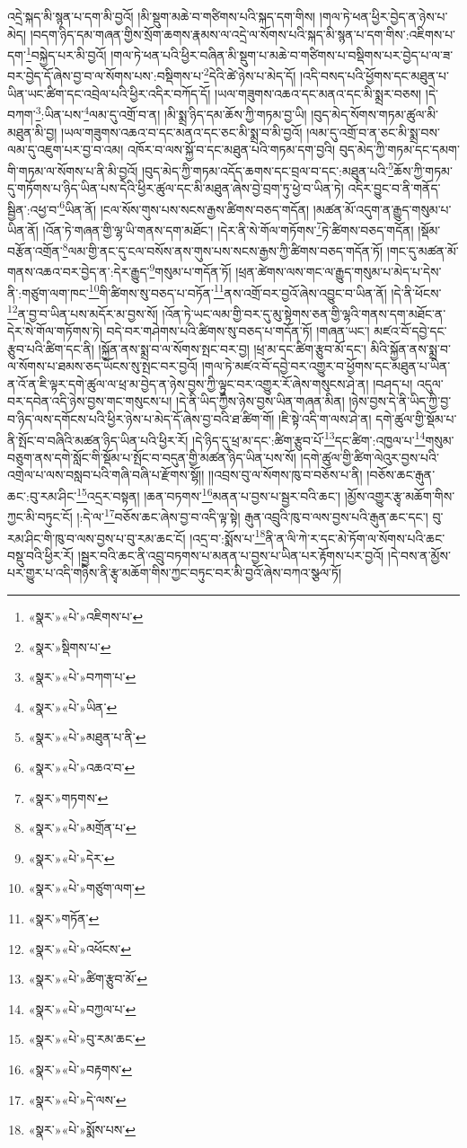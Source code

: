 འདྲེ་སྐད་མི་སྙན་པ་དག་མི་བྱའོ། །མི་སྡུག་མཆེ་བ་གཙིགས་པའི་སྐད་དག་གིས། །གལ་ཏེ་ཕན་ཕྱིར་བྱེད་ན་ཉེས་པ་མེད། །བདག་ཉིད་དམ་གཞན་གྱིས་སྲོག་ཆགས་རྣམས་ལ་འདྲེ་ལ་སོགས་པའི་སྐད་མི་སྙན་པ་དག་གིས་:འཇིགས་པ་དག་\footnote{«སྣར་»«པེ་»འཇིགས་པ་}བསྐྱེད་པར་མི་བྱའོ། །གལ་ཏེ་ཕན་པའི་ཕྱིར་བཞིན་མི་སྡུག་པ་མཆེ་བ་གཙིགས་པ་བསྡིགས་པར་བྱེད་པ་ལ་ཟ་བར་བྱེད་དོ་ཞེས་བྱ་བ་ལ་སོགས་པས་:བསྡིགས་པ་\footnote{«སྣར་»སྡིགས་པ་}དེའི་ཚེ་ཉེས་པ་མེད་དོ། །འདི་བསད་པའི་ཕྱོགས་དང་མཐུན་པ་ཡིན་ཡང་ཚིག་དང་འབྲེལ་པའི་ཕྱིར་འདིར་བཀོད་དོ། །ཡལ་གཟུགས་འཆའ་དང་མནའ་དང་མི་སྨྲར་བཅས། །དེ་བཀག་\footnote{«སྣར་»«པེ་»བཀག་པ་}:ཡིན་པས་\footnote{«སྣར་»«པེ་»ཡིན་}ལམ་དུ་འགྲོ་བ་ན། །མི་སྨྲ་ཉིད་དམ་ཆོས་ཀྱི་གཏམ་བྱ་ཡི། །བུད་མེད་སོགས་གཏམ་ཚུལ་མི་མཐུན་མི་བྱ། །ཡལ་གཟུགས་འཆའ་བ་དང་མནའ་དང་ཅང་མི་སྨྲ་བ་མི་བྱའོ། །ལམ་དུ་འགྲོ་བ་ན་ཅང་མི་སྨྲ་བས་ལམ་དུ་འཇུག་པར་བྱ་བ་འམ། འཁོར་བ་ལས་སྐྱོ་བ་དང་མཐུན་པའི་གཏམ་དག་བྱའི། བུད་མེད་ཀྱི་གཏམ་དང་དམག་གི་གཏམ་ལ་སོགས་པ་ནི་མི་བྱའོ། །བུད་མེད་ཀྱི་གཏམ་འདོད་ཆགས་དང་བྲལ་བ་དང་:མཐུན་པའི་\footnote{«སྣར་»«པེ་»མཐུན་པ་ནི་}ཆོས་ཀྱི་གཏམ་དུ་གཏོགས་པ་ཉིད་ཡིན་པས་དེའི་ཕྱིར་ཚུལ་དང་མི་མཐུན་ཞེས་བྱེ་བྲག་ཏུ་ཕྱེ་བ་ཡིན་ཏེ། འདིར་བྱུང་བ་ནི་གནོད་སྦྱིན་:འཕྱ་བ་\footnote{«སྣར་»«པེ་»འཆའ་བ་}ཡིན་ནོ། །ངལ་སོས་གུས་པས་སངས་རྒྱས་ཚིགས་བཅད་གདོན། །མཚན་མོ་འདུག་ན་རྒྱུད་གསུམ་པ་ཡིན་ནོ། །འོན་ཏེ་གཞན་གྱི་ལྷ་ཡི་གནས་དག་མཐོང་། །དེར་ནི་སེ་གོལ་གཏོགས་\footnote{«སྣར་»གཏགས་}ཏེ་ཚིགས་བཅད་གདོན། །སྡོམ་བརྩོན་འགྲོན་\footnote{«སྣར་»«པེ་»མགྲོན་པ་}ལམ་གྱི་ནང་དུ་ངལ་བསོས་ནས་གུས་པས་སངས་རྒྱས་ཀྱི་ཚིགས་བཅད་གདོན་ཏོ། །གང་དུ་མཚན་མོ་གནས་འཆའ་བར་བྱེད་ན་:དེར་རྒྱུད་\footnote{«སྣར་»«པེ་»དེར་}གསུམ་པ་གདོན་ཏོ། །ཕྲན་ཚེགས་ལས་གང་ལ་རྒྱུད་གསུམ་པ་མེད་པ་དེས་ནི་:གཙུག་ལག་ཁང་\footnote{«སྣར་»«པེ་»གཙུག་ལག་}གི་ཚིགས་སུ་བཅད་པ་བཏོན་\footnote{«སྣར་»གཏོན་}ནས་འགྲོ་བར་བྱའོ་ཞེས་འབྱུང་བ་ཡིན་ནོ། །དེ་ནི་ཕོངས་\footnote{«སྣར་»«པེ་»འཕོངས་}ན་བྱ་བ་ཡིན་པས་མདོར་མ་བྱས་སོ། །འོན་ཏེ་ཡང་ལམ་གྱི་བར་དུ་མུ་སྟེགས་ཅན་གྱི་ལྷའི་གནས་དག་མཐོང་ན་དེར་སེ་གོལ་གཏོགས་ཏེ། བདེ་བར་གཤེགས་པའི་ཚིགས་སུ་བཅད་པ་གདོན་ཏོ། །གཞན་ཡང་། མཛའ་བོ་དབྱེ་དང་རྩུབ་པའི་ཚིག་དང་ནི། །སྐྱོན་ནས་སྨྲ་བ་ལ་སོགས་སྤང་བར་བྱ། །ཕྲ་མ་དང་ཚིག་རྩུབ་མོ་དང་། མིའི་སྐྱོན་ནས་སྨྲ་བ་ལ་སོགས་པ་ཐམས་ཅད་ཡོངས་སུ་སྤང་བར་བྱའོ། །གལ་ཏེ་མཛའ་བོ་དབྱེ་བར་འགྱུར་བ་ཕྱོགས་དང་མཐུན་པ་ཡིན་ན་འོ་ན་ཇི་ལྟར་དགེ་ཚུལ་ལ་ཕྲ་མ་བྱེད་ན་ཉེས་བྱས་ཀྱི་ལྟུང་བར་འགྱུར་རོ་ཞེས་གསུངས་ཤེ་ན། །བཤད་པ། འདུལ་བར་དབེན་འདི་ཉེས་བྱས་གང་གསུངས་པ། །དེ་ནི་ཡིད་ཀྱིས་ཉེས་བྱས་ཡིན་གཞན་མིན། །ཉེས་བྱས་དེ་ནི་ཡིད་ཀྱི་བྱ་བ་ཉིད་ལས་དགོངས་པའི་ཕྱིར་ཉེས་པ་མེད་དོ་ཞེས་བྱ་བའི་ཐ་ཚིག་གོ། །ཇི་སྟེ་འདི་ག་ལས་ཤེ་ན། དགེ་ཚུལ་གྱི་སྡོམ་པ་ནི་སྤོང་བ་བཞིའི་མཚན་ཉིད་ཡིན་པའི་ཕྱིར་རོ། །དེ་ཉིད་དུ་ཕྲ་མ་དང་:ཚིག་རྩུབ་པོ་\footnote{«སྣར་»«པེ་»ཚིག་རྩུབ་མོ་}དང་ཚིག་:འཁྱལ་པ་\footnote{«སྣར་»«པེ་»བཀྱལ་པ་}གསུམ་བཅུག་ནས་དགེ་སློང་གི་སྡོམ་པ་སྤོང་བ་བདུན་གྱི་མཚན་ཉིད་ཡིན་པས་སོ། །དགེ་ཚུལ་གྱི་ཚིག་ལེའུར་བྱས་པའི་འགྲེལ་པ་ལས་བསླབ་པའི་གཞི་བཞི་པ་རྫོགས་སྷོ།། །།འབྲས་བུ་ལ་སོགས་ཁུ་བ་བཅོས་པ་ནི། །བཅོས་ཆང་རྒུན་ཆང་:བུ་རམ་ཤིང་\footnote{«སྣར་»«པེ་»བུ་རམ་ཆང་}འདྲར་བསྟན། །ཆན་བཏགས་\footnote{«སྣར་»«པེ་»བརྟགས་}མནན་པ་བྱས་པ་སྦྱར་བའི་ཆང་། །མྱོས་འགྱུར་རྩྭ་མཆོག་གིས་ཀྱང་མི་བཏུང་ངོ། །:དེ་ལ་\footnote{«སྣར་»«པེ་»དེ་ལས་}བཅོས་ཆང་ཞེས་བྱ་བ་འདི་ལྟ་སྟེ། རྒུན་འབྲུའི་ཁུ་བ་ལས་བྱས་པའི་རྒུན་ཆང་དང་། བུ་རམ་ཤིང་གི་ཁུ་བ་ལས་བྱས་པ་བུ་རམ་ཆང་ངོ། །འདྲ་བ་:སྨོས་པ་\footnote{«སྣར་»«པེ་»སྨོས་པས་}ནི་ན་ལི་ཀེ་ར་དང་མེ་ཏོག་ལ་སོགས་པའི་ཆང་བསྡུ་བའི་ཕྱིར་རོ། །སྦྱར་བའི་ཆང་ནི་འབྲུ་བཏགས་པ་མནན་པ་བྱས་པ་ཡིན་པར་རྟོགས་པར་བྱའོ། །དེ་བས་ན་མྱོས་པར་གྱུར་པ་འདི་གཉིས་ནི་རྩྭ་མཆོག་གིས་ཀྱང་བཏུང་བར་མི་བྱའོ་ཞེས་བཀའ་སྩལ་ཏོ། 